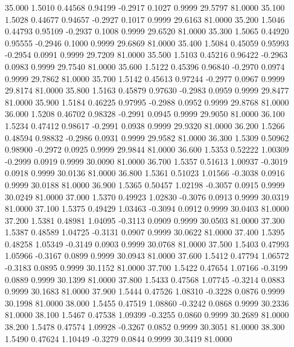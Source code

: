   35.000   1.5010   0.44568   0.94199  -0.2917   0.1027   0.9999  29.5797  81.0000
  35.100   1.5028   0.44677   0.94657  -0.2927   0.1017   0.9999  29.6163  81.0000
  35.200   1.5046   0.44793   0.95109  -0.2937   0.1008   0.9999  29.6520  81.0000
  35.300   1.5065   0.44920   0.95555  -0.2946   0.1000   0.9999  29.6869  81.0000
  35.400   1.5084   0.45059   0.95993  -0.2954   0.0991   0.9999  29.7209  81.0000
  35.500   1.5103   0.45216   0.96422  -0.2963   0.0983   0.9999  29.7540  81.0000
  35.600   1.5122   0.45396   0.96840  -0.2970   0.0974   0.9999  29.7862  81.0000
  35.700   1.5142   0.45613   0.97244  -0.2977   0.0967   0.9999  29.8174  81.0000
  35.800   1.5163   0.45879   0.97630  -0.2983   0.0959   0.9999  29.8477  81.0000
  35.900   1.5184   0.46225   0.97995  -0.2988   0.0952   0.9999  29.8768  81.0000
  36.000   1.5208   0.46702   0.98328  -0.2991   0.0945   0.9999  29.9050  81.0000
  36.100   1.5234   0.47412   0.98617  -0.2991   0.0938   0.9999  29.9320  81.0000
  36.200   1.5266   0.48594   0.98832  -0.2986   0.0931   0.9999  29.9582  81.0000
  36.300   1.5309   0.50962   0.98900  -0.2972   0.0925   0.9999  29.9844  81.0000
  36.600   1.5353   0.52222   1.00309  -0.2999   0.0919   0.9999  30.0090  81.0000
  36.700   1.5357   0.51613   1.00937  -0.3019   0.0918   0.9999  30.0136  81.0000
  36.800   1.5361   0.51023   1.01566  -0.3038   0.0916   0.9999  30.0188  81.0000
  36.900   1.5365   0.50457   1.02198  -0.3057   0.0915   0.9999  30.0249  81.0000
  37.000   1.5370   0.49923   1.02830  -0.3076   0.0913   0.9999  30.0319  81.0000
  37.100   1.5375   0.49429   1.03463  -0.3094   0.0912   0.9999  30.0403  81.0000
  37.200   1.5381   0.48981   1.04095  -0.3113   0.0909   0.9999  30.0503  81.0000
  37.300   1.5387   0.48589   1.04725  -0.3131   0.0907   0.9999  30.0622  81.0000
  37.400   1.5395   0.48258   1.05349  -0.3149   0.0903   0.9999  30.0768  81.0000
  37.500   1.5403   0.47993   1.05966  -0.3167   0.0899   0.9999  30.0943  81.0000
  37.600   1.5412   0.47794   1.06572  -0.3183   0.0895   0.9999  30.1152  81.0000
  37.700   1.5422   0.47654   1.07166  -0.3199   0.0889   0.9999  30.1399  81.0000
  37.800   1.5433   0.47568   1.07745  -0.3214   0.0883   0.9999  30.1683  81.0000
  37.900   1.5444   0.47526   1.08310  -0.3228   0.0876   0.9999  30.1998  81.0000
  38.000   1.5455   0.47519   1.08860  -0.3242   0.0868   0.9999  30.2336  81.0000
  38.100   1.5467   0.47538   1.09399  -0.3255   0.0860   0.9999  30.2689  81.0000
  38.200   1.5478   0.47574   1.09928  -0.3267   0.0852   0.9999  30.3051  81.0000
  38.300   1.5490   0.47624   1.10449  -0.3279   0.0844   0.9999  30.3419  81.0000
